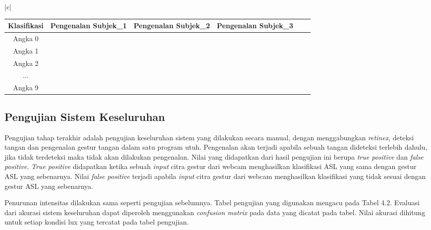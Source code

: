 \begin{table}[H]
\begin{tabular}{|c|}
	\\
	\begin{tabular}{|c|c|c|c|c|c|c|c|c|c|c|c|c|c|c|c|c|c|c|c|c|c|c|c|c|c|c|c|c|c|c|c|c|}
		\hline
		Klasifikasi & \multicolumn{10}{|c|}{Pengenalan Subjek\_1}& \multicolumn{10}{|c|}{Pengenalan Subjek\_2}& \multicolumn{10}{|c|}{Pengenalan Subjek\_3}\\
		\hline Angka 0 & & & &&&&&&&&&&&&&&&&&&&&&&&&&&&\\
		\hline Angka 1 & & & &&&&&&&&&&&&&&&&&&&&&&&&&&&\\	
		\hline Angka 2 & & & &&&&&&&&&&&&&&&&&&&&&&&&&&&\\
		\hline ... & & & &&&&&&&&&&&&&&&&&&&&&&&&&&& \\
		\hline Angka 9 & & & &&&&&&&&&&&&&&&&&&&&&&&&&&& \\
		\hline
	\end{tabular}
\end{tabular}
\end{table}
\subsection{Pengujian Sistem Keseluruhan}
Pengujian tahap terakhir adalah pengujian keseluruhan sistem yang dilakukan secara manual, dengan menggabungkan \emph{retinex}, deteksi tangan dan pengenalan gestur tangan dalam satu program utuh. Pengenalan akan terjadi apabila sebuah tangan dideteksi terlebih dahulu, jika tidak terdeteksi maka tidak akan dilakukan pengenalan. Nilai yang didapatkan dari hasil pengujian ini berupa \emph{true positive} dan \emph{false positive}. \emph{True positive} didapatkan ketika sebuah \emph{input} citra gestur dari webcam menghasilkan klasifikasi ASL yang sama dengan gestur ASL yang sebenarnya. Nilai \emph{false positive} terjadi apabila \emph{input} citra gestur dari webcam menghasilkan klasifikasi yang tidak sesuai dengan gestur ASL yang sebenarnya.

Penurunan intensitas dilakukan sama seperti pengujian sebelumnya. Tabel pengujian yang digunakan mengacu pada Tabel 4.2. Evaluasi dari akurasi sistem keseluruhan dapat diperoleh menggunakan \emph{confusion matrix} pada data yang dicatat pada tabel. Nilai akurasi dihitung untuk setiap kondisi lux yang tercatat pada tabel pengujian.